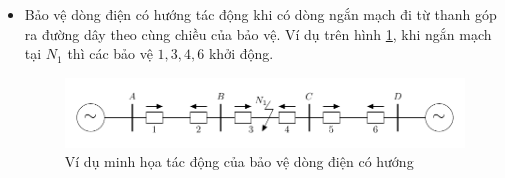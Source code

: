 \documentclass[12pt,a4paper]{article}
\begin{document}
\begin{itemize}
		\item Bảo vệ dòng điện có hướng tác động khi có dòng ngắn mạch đi từ thanh góp ra đường dây theo cùng chiều của bảo vệ. Ví dụ trên hình \ref{Fig:viduminhhoa-bvdongdiencohuong}, khi ngắn mạch tại $N_1$ thì các bảo vệ $1, 3, 4, 6$ khởi động.
			\begin{figure}[!h]
				\begin{center}					
					\includegraphics[scale=1]{diagram-draw-tikz/Figure-viduminhhoa-baove-dongdiencohuong.pdf} 
				\end{center}
				\caption{Ví dụ minh họa tác động của bảo vệ dòng điện có hướng} \label{Fig:viduminhhoa-bvdongdiencohuong}
			\end{figure}
	\end{itemize}
\end{document}
